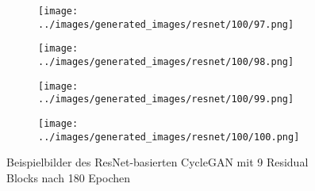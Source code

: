 \begin{figure}[H]
\begin{subfigure}[b]{0.1\textwidth}
\end{subfigure}
\hspace{1em}%
\begin{subfigure}[b]{0.1\textwidth}
\centering
\texttt{[image: ../images/generated\_images/resnet/100/97.png]}
\end{subfigure}
\hspace{1em}%
\begin{subfigure}[b]{0.1\textwidth}
\centering
\texttt{[image: ../images/generated\_images/resnet/100/98.png]}
\end{subfigure}
\hspace{1em}%
\begin{subfigure}[b]{0.1\textwidth}
\centering
\texttt{[image: ../images/generated\_images/resnet/100/99.png]}
\end{subfigure}
\hspace{1em}%
\begin{subfigure}[b]{0.1\textwidth}
\centering
\texttt{[image: ../images/generated\_images/resnet/100/100.png]}
\end{subfigure}
     \caption{Beispielbilder des ResNet-basierten \ac{CycleGAN} mit 9 Residual Blocks nach 180 Epochen}
     \label{fig:resnet-imgs}
\end{figure}

